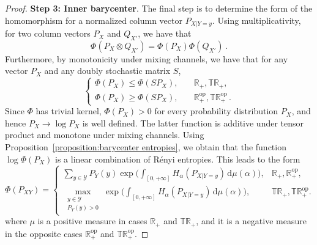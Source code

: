 \documentclass[aps,pra,11pt,onecolumn,nofootinbib,tightenlines]{revtex4-2}
\theoremstyle{definition}
\begin{document}
\begin{proof}
\noindent \textbf{Step 3: Inner barycenter}. The final step is to determine the form of the homomorphism for a normalized column vector $P_{X|Y=y}$. Using multiplicativity, for two column vectors $P_X$ and $Q_{X'}$, we have that
\begin{equation}
    \Phi(P_X \otimes Q_{X'}) = \Phi(P_X) \Phi(Q_{X'}) \,.
\end{equation}
Furthermore, by monotonicity under mixing channels, we have that for any vector $P_X$ and any doubly stochastic matrix $S$,
\begin{equation}
\begin{cases}
 \Phi(P_X)\leq \Phi(SP_X), & \quad \mathbb{R}_+,\mathbb{TR}_+, \\
\Phi(P_X) \geq \Phi(SP_X), & \quad \mathbb{R}_+^{\mathrm{op}},\mathbb{TR}_+^{\mathrm{op}}\,.
\end{cases}
\end{equation}
Since $\Phi$ has trivial kernel, $\Phi(P_X)>0$ for every probability distribution $P_X$, and hence $P_X\to \log{P_X}$ is well defined.
The latter function is additive under tensor product and monotone under mixing channels. Using Proposition~\ref{proposition:barycenter entropies}, we obtain that the function $\log{\Phi(P_X)}$ is a linear combination of Rényi entropies. This leads to the form
\begin{equation}
\label{eq:FinalForm proof}
\Phi(P_{XY}) =
\begin{cases}
\displaystyle \sum_{y \in \mathcal{Y}} P_Y(y) \exp\Bigg(\int_{[0,+\infty]} H_\alpha(P_{X|Y=y}) \, \mathrm{d}\mu(\alpha) \Bigg), & \mathbb{R}_+,\mathbb{R}_+^{\mathrm{op}}, \\
\displaystyle \max \limits_{\substack{y \in \mathcal{Y} \\ P_Y( y) > 0}} \exp\Bigg(\int_{[0,+\infty]} H_\alpha(P_{X|Y=y}) \, \mathrm{d}\mu(\alpha) \Bigg), & \mathbb{TR}_+,\mathbb{TR}_+^{\mathrm{op}}.
\end{cases}
\end{equation}
where $\mu$ is a positive measure in cases $\mathbb{R}_+$ and $\mathbb{TR}_+$, and it is a negative measure in the opposite cases $\mathbb{R}^{\mathrm{op}}_+$ and $\mathbb{TR}^{\mathrm{op}}_+$.

\bigskip
\bigskip


\end{proof}
\end{document}
